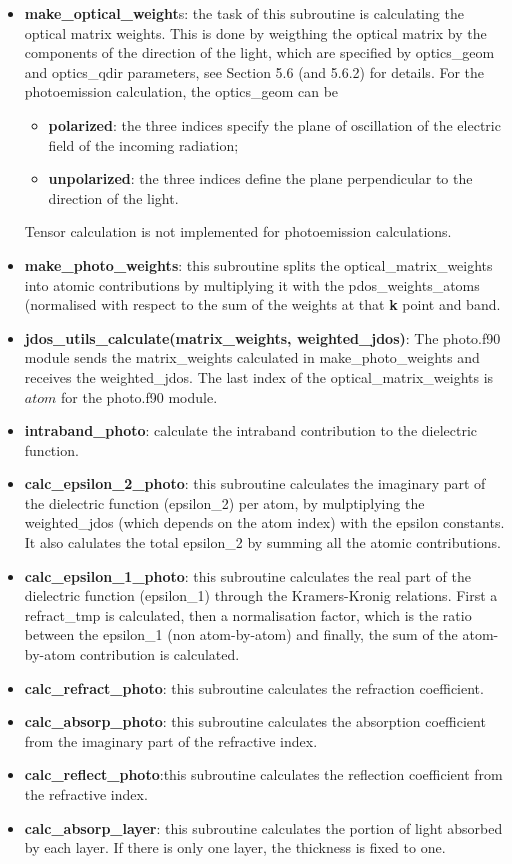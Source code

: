 \documentclass[a4paper,11pt,twoside]{book}
\begin{document}
\begin{itemize}
\item  {\bf make\_optical\_weight}s: the task of this subroutine is
	calculating the optical matrix weights. 
	This is done by weigthing the optical matrix by the components of the direction of the light, 
	which are specified by optics\_geom and optics\_qdir
	parameters, see Section 5.6 (and 5.6.2) for details.
	For the photoemission calculation, the optics\_geom can be
	\begin{itemize}
        \item {\bf polarized}: the three indices specify the 
		plane of oscillation of the electric field 
		of the incoming radiation;
        \item {\bf unpolarized}: the three indices define the
		plane perpendicular to the direction
		of the light.
	\end{itemize}
   Tensor calculation is not implemented for photoemission calculations.
\item  {\bf make\_photo\_weights}: this subroutine splits the optical\_matrix\_weights
	into atomic contributions by multiplying it with the pdos\_weights\_atoms
	(normalised with respect to the sum of the weights at that {\bf k} point and band.

\item  {\bf jdos\_utils\_calculate(matrix\_weights, weighted\_jdos)}:
       The photo.f90 module sends the matrix\_weights calculated in make\_photo\_weights and receives the
       weighted\_jdos. The last index of the optical\_matrix\_weights is $atom$ for the photo.f90 module.

\item  {\bf intraband\_photo}: calculate the intraband contribution to the dielectric function.

\item  {\bf calc\_epsilon\_2\_photo}: this subroutine calculates the imaginary part of the dielectric function (epsilon\_2) per atom, by mulptiplying the weighted\_jdos (which depends on the atom index) with the epsilon constants.
	It also calulates the total epsilon\_2 by summing all the atomic contributions.
\item  {\bf calc\_epsilon\_1\_photo}: this subroutine calculates the real part of the dielectric function (epsilon\_1) through the Kramers-Kronig relations.
	First a refract\_tmp is calculated, then a normalisation factor, which is the ratio between the epsilon\_1 (non atom-by-atom) and finally, the sum of the atom-by-atom contribution is calculated.
\item  {\bf calc\_refract\_photo}: this subroutine
	calculates the refraction coefficient.
\item  {\bf calc\_absorp\_photo}: this subroutine
       calculates the absorption coefficient from the 
       imaginary part of the refractive index.
\item  {\bf calc\_reflect\_photo}:this subroutine
       calculates the reflection coefficient from the
       refractive index.
\item  {\bf calc\_absorp\_layer}: this subroutine calculates
	the portion of light absorbed by each layer.
	If there is only one layer, the thickness is fixed to one.
	

\end{itemize}
\end{document}
